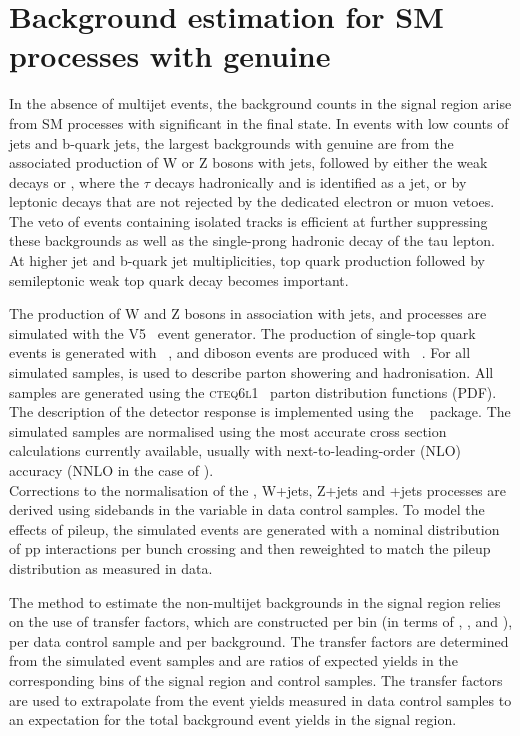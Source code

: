 \section{Background estimation for SM processes with genuine \texorpdfstring{\ETmiss}{MET}}
\label{sec:ewk_background}

In the absence of multijet events, the background counts in the signal
region arise from SM processes with significant \ETmiss in the final
state. In events with low counts of jets and b-quark jets, the largest
backgrounds with genuine \ETmiss are from the associated production of
W or Z bosons with jets, followed by either the weak decays \znunu or
\wtaunu, where the $\tau$ decays hadronically and is identified as a
jet, or by leptonic decays that are not rejected by the dedicated
electron or muon vetoes. The veto of events containing isolated tracks
is efficient at further suppressing these backgrounds as well as the
single-prong hadronic decay of the tau lepton. At higher jet and
b-quark jet multiplicities, top quark production followed by
semileptonic weak top quark decay becomes important.

The production of W and Z bosons in association with jets, \ttbar and
\gj processes are simulated with the \MADGRAPH V5~\cite{madgraph}
event generator. The production of single-top quark events is
generated with \POWHEG~\cite{powheg}, and diboson events are produced
with ~\cite{pythia8}. For all simulated samples, 
is used to describe parton showering and hadronisation. All samples
are generated using the \textsc{cteq6l1}~\cite{Pumplin:2002vw} parton
distribution functions (PDF). The description of the detector response
is implemented using the \GEANTfour~\cite{geant} package. The
simulated samples are normalised using the most accurate cross section
calculations currently available, usually with
next-to-leading-order (NLO) accuracy (NNLO in the case of \ttbar). \\
Corrections to the normalisation of the \gj, W+jets, Z+jets and \ttbar+jets 
processes are derived using sidebands in the \mht variable in data control samples. 
To model the effects of pileup, the simulated events are generated with a nominal distribution
of pp interactions per bunch crossing and then reweighted to match the
pileup distribution as measured in data.

The method to estimate the non-multijet backgrounds in the signal
region relies on the use of transfer factors, which are constructed
per bin (in terms of \njet, \nb, and \scalht), per data control
sample and per background. The transfer factors are determined from the simulated event
samples and are ratios of expected yields in the corresponding bins of
the signal region and control samples. The transfer factors are used
to extrapolate from the event yields measured in data control samples
to an expectation for the total background event yields in the signal
region.

